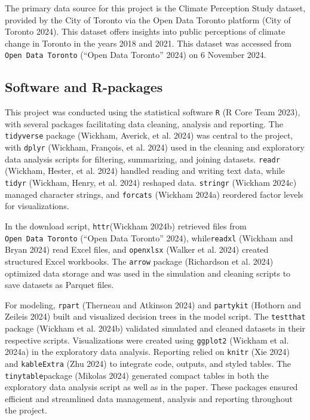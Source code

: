 \documentclass[
  letterpaper,
  DIV=11,
  numbers=noendperiod]{scrartcl}
\begin{document}
The primary data source for this project is the Climate Perception Study
dataset, provided by the City of Toronto via the Open Data Toronto
platform (City of Toronto 2024). This dataset offers insights into
public perceptions of climate change in Toronto in the years 2018 and
2021. This dataset was accessed from \texttt{Open\ Data\ Toronto}
({``Open Data Toronto''} 2024) on 6 November 2024.

\subsection{Software and R-packages}\label{software-and-r-packages}

This project was conducted using the statistical software \texttt{R} (R
Core Team 2023), with several packages facilitating data cleaning,
analysis and reporting. The \texttt{tidyverse} package (Wickham,
Averick, et al. 2024) was central to the project, with \texttt{dplyr}
(Wickham, François, et al. 2024) used in the cleaning and exploratory
data analysis scripts for filtering, summarizing, and joining datasets.
\texttt{readr} (Wickham, Hester, et al. 2024) handled reading and
writing text data, while \texttt{tidyr} (Wickham, Henry, et al. 2024)
reshaped data. \texttt{stringr} (Wickham 2024c) managed character
strings, and \texttt{forcats} (Wickham 2024a) reordered factor levels
for visualizations.

In the download script, \texttt{httr}(Wickham 2024b) retrieved files
from \texttt{Open\ Data\ Toronto} ({``Open Data Toronto''} 2024),
while\texttt{readxl} (Wickham and Bryan 2024) read Excel files, and
\texttt{openxlsx} (Walker et al. 2024) created structured Excel
workbooks. The \texttt{arrow} package (Richardson et al. 2024) optimized
data storage and was used in the simulation and cleaning scripts to save
datasets as Parquet files.

For modeling, \texttt{rpart} (Therneau and Atkinson 2024) and
\texttt{partykit} (Hothorn and Zeileis 2024) built and visualized
decision trees in the model script. The \texttt{testthat} package
(Wickham et al. 2024b) validated simulated and cleaned datasets in their
respective scripts. Visualizations were created using \texttt{ggplot2}
(Wickham et al. 2024a) in the exploratory data analysis. Reporting
relied on \texttt{knitr} (Xie 2024) and \texttt{kableExtra} (Zhu 2024)
to integrate code, outputs, and styled tables. The
\texttt{tinytable}package (Mikolas 2024) generated compact tables in
both the exploratory data analysis script as well as in the paper. These
packages ensured efficient and streamlined data management, analysis and
reporting throughout the project.
\end{document}

